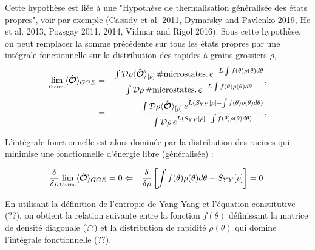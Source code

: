 	Cette hypothèse est liée à une "Hypothèse de thermalisation généralisée des états propres", voir par exemple (Cassidy et al. 2011, Dymarsky and Pavlenko 2019, He et al. 2013, Pozsgay 2011, 2014, Vidmar and Rigol 2016). Sous cette hypothèse, on peut remplacer la somme précédente sur tous les états propres par une intégrale fonctionnelle sur la distribution des rapides à grains grossiers $\rho$,
	\begin{eqnarray}
		\underset{\mbox{\tiny therm.}}{\lim} \langle \hat{\bm{\mathcal{O}}}\rangle_{GGE} & = & \frac{\int \mathcal{D} \rho \langle \hat{\bm{\mathcal{O}}}\rangle_{[\rho]} \, \#\mbox{microstates.}\,  e^{-L\int f ( \theta ) \rho ( \theta ) d \theta } }{\int \mathcal{D} \rho  \, \#\mbox{microstates.}\,  e^{-L\int f ( \theta ) \rho ( \theta ) d \theta }},\\
		& = & \frac{\int \mathcal{D} \rho \langle \hat{\bm{\mathcal{O}}}\rangle_{[\rho]} \,   e^{L ( S_{YY}[\rho] -  \int f ( \theta ) \rho ( \theta ) d \theta) }}{\int \mathcal{D} \rho  \,  e^{L ( S_{YY}[\rho] -  \int f ( \theta ) \rho ( \theta ) d \theta)  }},
	\end{eqnarray}
	
	L'intégrale fonctionnelle est alors dominée par la distribution des racines qui minimise une fonctionnelle d'énergie libre (généralisée) :
	
	\begin{eqnarray}
		\frac{\delta}{\delta \rho}	\underset{\mbox{\tiny therm.}}{\lim} \langle \operator{\mathcal{O}} \rangle_{GGE} = 0 & \Leftarrow & \frac{\delta}{\delta \rho} \left [ \int  f(\theta) \rho(\theta )  d\theta - S_{YY} [\rho] \right ] = 0  
	\end{eqnarray}
	
	En utilisant la définition de l'entropie de Yang-Yang et l'équation constitutive (??), on obtient la relation suivante entre la fonction $f(\theta)$ définissant la matrice de densité diagonale (??) et la distribution de rapidité $\rho (\theta)$ qui domine l'intégrale fonctionnelle (??).\\
	

